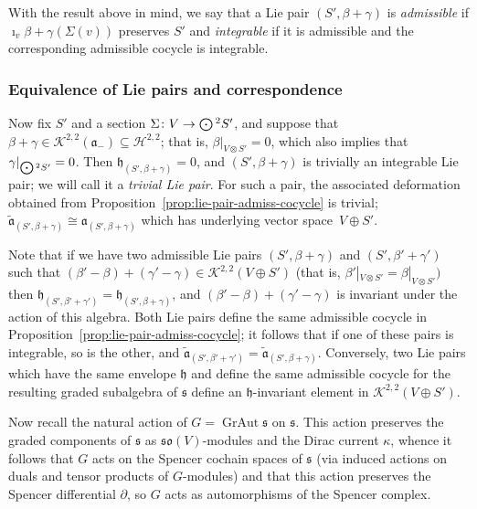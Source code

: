 \documentclass[10pt,a4paper]{amsart}
\numberwithin{equation}{section}
\newcommand{\fa}{\mathfrak{a}}
\newcommand{\fh}{\mathfrak{h}}
\newcommand{\fs}{\mathfrak{s}}
\newcommand{\fso}{\mathfrak{so}}
\newcommand{\cH}{\mathcal{H}}
\newcommand{\cK}{\mathcal{K}}
\newcommand{\fatilde}{\widetilde{\fa}}
\newcommand{\Odot}{\mathchoice{{\textstyle\bigodot}}{\bigodot}{\bigodot}{\bigodot}}
\newcommand{\1}{\mathbbm{1}}
\DeclareMathOperator{\GrAut}{GrAut}
\begin{document}
With the result above in mind, we say that a Lie pair $(S',\beta+\gamma)$ is \emph{admissible} if $\imath_v\beta+\gamma(\Sigma(v))$ preserves $S'$ and \emph{integrable} if it is admissible and the corresponding admissible cocycle is integrable.

\subsubsection{Equivalence of Lie pairs and correspondence}

Now fix $S'$ and a section $\Sigma\colon V\to\Odot^2S'$, and suppose that $\beta+\gamma\in\cK^{2,2}(\fa_-)\subseteq\cH^{2,2}$; that is, $\beta|_{V\otimes S'}=0$, which also implies that $\gamma|_{\Odot^2S'}=0$. Then $\fh_{(S',\beta+\gamma)}=0$, and $(S',\beta+\gamma)$ is trivially an integrable Lie pair; we will call it a \emph{trivial Lie pair}. For such a pair, the associated deformation obtained from Proposition~\ref{prop:lie-pair-admiss-cocycle} is trivial; $\fatilde_{(S',\beta+\gamma)}\cong\fa_{(S',\beta+\gamma)}$ which has underlying vector space~${V\oplus S'}$.

Note that if we have two admissible Lie pairs $(S',\beta+\gamma)$ and $(S',\beta'+\gamma')$ such that $(\beta'-\beta)+(\gamma'-\gamma)\in\cK^{2,2}(V\oplus S')$ (that is, $\beta'|_{V\otimes S'}=\beta|_{V\otimes S'})$ then $\fh_{(S',\beta'+\gamma')}=\fh_{(S',\beta+\gamma)}$, and $(\beta'-\beta)+(\gamma'-\gamma)$ is invariant under the action of this algebra. Both Lie pairs define the same admissible cocycle in Proposition~\ref{prop:lie-pair-admiss-cocycle}; it follows that if one of these pairs is integrable, so is the other, and $\fatilde_{(S',\beta'+\gamma')}=\fatilde_{(S',\beta+\gamma)}$. Conversely, two Lie pairs which have the same envelope $\fh$ and define the same admissible cocycle for the resulting graded subalgebra of $\fs$ define an $\fh$-invariant element in $\cK^{2,2}(V\oplus S')$.

Now recall the natural action of $G=\GrAut\fs$ on $\fs$. This action preserves the graded components of $\fs$ as $\fso(V)$-modules and the Dirac current $\kappa$, whence it follows that $G$ acts on the Spencer cochain spaces of $\fs$ (via induced actions on duals and tensor products of $G$-modules) and that this action preserves the Spencer differential $\partial$, so $G$ acts as automorphisms of the Spencer complex.
\end{document}
